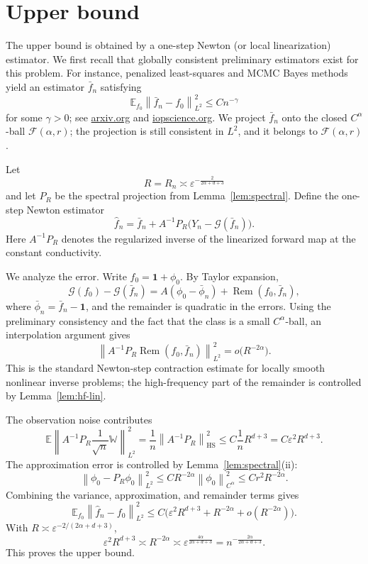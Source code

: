 \documentclass{article}
\theoremstyle{remark}
\newcommand{\E}{\mathbb E}
\newcommand{\W}{\mathbb W}
\newcommand{\cF}{\mathcal F}
\newcommand{\cG}{\mathcal G}
\newcommand{\norm}[1]{\left\|#1\right\|}
\newcommand{\one}{\mathbf 1}
\begin{document}
\section{Upper bound}

The upper bound is obtained by a one-step Newton (or local linearization) estimator. We first recall that globally consistent preliminary estimators exist for this problem. For instance, penalized least-squares and MCMC Bayes methods yield an estimator \(\bar f_n\) satisfying
\[
\E_{f_0}\norm{\bar f_n-f_0}_{L^2}^2\le C n^{-\gamma}
\]
for some \(\gamma>0\); see \href{https://arxiv.org/html/2601.09007}{arxiv.org} and \href{https://google.iopscience.iop.org/article/10.1088/1361-6420/ab7d2a}{iopscience.org}. We project \(\bar f_n\) onto the closed \(C^\alpha\)-ball \(\cF(\alpha,r)\); the projection is still consistent in \(L^2\), and it belongs to \(\cF(\alpha,r)\).

Let
\[
R=R_n\asymp \varepsilon^{-\frac{2}{2\alpha+d+3}}
\]
and let \(P_R\) be the spectral projection from Lemma~\ref{lem:spectral}. Define the one-step Newton estimator
\[
\hat f_n
=\bar f_n+A^{-1}P_R\bigl(Y_n-\cG(\bar f_n)\bigr).
\]
Here \(A^{-1}P_R\) denotes the regularized inverse of the linearized forward map at the constant conductivity.

We analyze the error. Write \(f_0=\one+\phi_0\). By Taylor expansion,
\[
\cG(f_0)-\cG(\bar f_n)
=A(\phi_0-\bar\phi_n)+\operatorname{Rem}(f_0,\bar f_n),
\]
where \(\bar\phi_n=\bar f_n-\one\), and the remainder is quadratic in the errors. Using the preliminary consistency and the fact that the class is a small \(C^\alpha\)-ball, an interpolation argument gives
\[
\norm{A^{-1}P_R\operatorname{Rem}(f_0,\bar f_n)}_{L^2}^2
=o\bigl(R^{-2\alpha}\bigr).
\]
This is the standard Newton-step contraction estimate for locally smooth nonlinear inverse problems; the high-frequency part of the remainder is controlled by Lemma~\ref{lem:hf-lin}.

The observation noise contributes
\[
\E\norm{A^{-1}P_R \frac1{\sqrt n}\W}_{L^2}^2
=\frac1n\norm{A^{-1}P_R}_{\mathrm{HS}}^2
\le C\frac1n R^{d+3}
=C\varepsilon^2 R^{d+3}.
\]
The approximation error is controlled by Lemma~\ref{lem:spectral}(ii):
\[
\norm{\phi_0-P_R\phi_0}_{L^2}^2
\le C R^{-2\alpha}\norm{\phi_0}_{C^\alpha}^2
\le C r^2 R^{-2\alpha}.
\]
Combining the variance, approximation, and remainder terms gives
\[
\E_{f_0}\norm{\hat f_n-f_0}_{L^2}^2
\le C\bigl(\varepsilon^2 R^{d+3}+R^{-2\alpha}+o(R^{-2\alpha})\bigr).
\]
With \(R\asymp \varepsilon^{-2/(2\alpha+d+3)}\),
\[
\varepsilon^2 R^{d+3}
\asymp R^{-2\alpha}
\asymp \varepsilon^{\frac{4\alpha}{2\alpha+d+3}}
=n^{-\frac{2\alpha}{2\alpha+d+3}}.
\]
This proves the upper bound.
\end{document}
